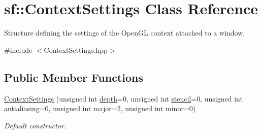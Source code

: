 \hypertarget{structsf_1_1_context_settings}{\section{sf\-:\-:Context\-Settings Class Reference}
\label{structsf_1_1_context_settings}
}


Structure defining the settings of the Open\-G\-L context attached to a window.  




{\ttfamily \#include $<$Context\-Settings.\-hpp$>$}

\subsection*{Public Member Functions}
\begin{DoxyCompactItemize}
\item 
\hyperlink{structsf_1_1_context_settings_aafe35f8e257f9d1e496ed64e33e2ee9f}{Context\-Settings} (unsigned int \hyperlink{gl3_8h_a6fe5f09cdb51e330bab7eae97ac343a3}{depth}=0, unsigned int \hyperlink{gl3_8h_aecd18db993a66d833647945966799ca5}{stencil}=0, unsigned int antialiasing=0, unsigned int major=2, unsigned int minor=0)
\begin{DoxyCompactList}\small\item\em Default constructor. \end{DoxyCompactList}\end{DoxyCompactItemize}
